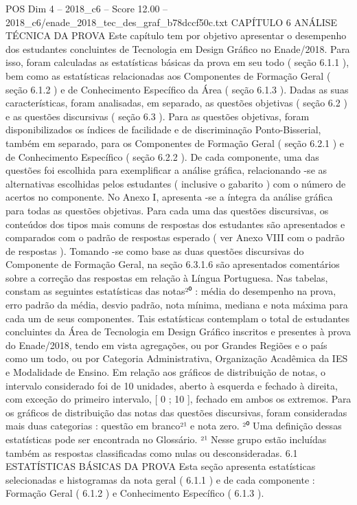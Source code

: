 \begin{textsample}{POS Dim 4 – 2018\_c6 – Score 12.00 – 2018\_c6/enade\_2018\_tec\_des\_graf\_b78dccf50c.txt}  \label{ex:f4_pos_017}
CAPÍTULO 6 ANÁLISE TÉCNICA DA PROVA Este capítulo tem por objetivo apresentar o desempenho dos estudantes concluintes de Tecnologia em Design Gráfico no Enade/2018.
Para isso, foram calculadas as estatísticas básicas da prova em seu todo ( seção 6.1.1 ), bem como as estatísticas relacionadas aos Componentes de Formação Geral ( seção 6.1.2 ) e de Conhecimento Específico da Área ( seção 6.1.3 ).
Dadas as suas características, foram analisadas, em separado, as questões objetivas ( seção 6.2 ) e as questões discursivas ( seção 6.3 ).
Para as questões objetivas, foram disponibilizados os índices de facilidade e de discriminação Ponto-Bisserial, também em separado, para os Componentes de Formação Geral ( seção 6.2.1 ) e de Conhecimento Específico ( seção 6.2.2 ).
De cada componente, uma das questões foi escolhida para exemplificar a análise gráfica, relacionando -se as alternativas escolhidas pelos estudantes ( inclusive o gabarito ) com o número de acertos no componente.
No Anexo I, apresenta -se a íntegra da análise gráfica para todas as questões objetivas.
Para cada uma das questões discursivas, os conteúdos dos tipos mais comuns de respostas dos estudantes são apresentados e comparados com o padrão de respostas esperado ( ver Anexo VIII com o padrão de respostas ).
Tomando -se como base as duas questões discursivas do Componente de Formação Geral, na seção 6.3.1.6 são apresentados comentários sobre a correção das respostas em relação à Língua Portuguesa.
Nas tabelas, constam as seguintes estatísticas das notas²⁰ : média do desempenho na prova, erro padrão da média, desvio padrão, nota mínima, mediana e nota máxima para cada um de seus componentes.
Tais estatísticas contemplam o total de estudantes concluintes da Área de Tecnologia em Design Gráfico inscritos e presentes à prova do Enade/2018, tendo em vista agregações, ou por Grandes Regiões e o país como um todo, ou por Categoria Administrativa, Organização Acadêmica da IES e Modalidade de Ensino.
Em relação aos gráficos de distribuição de notas, o intervalo considerado foi de 10 unidades, aberto à esquerda e fechado à direita, com exceção do primeiro intervalo, [ 0 ; 10 ], fechado em ambos os extremos.
Para os gráficos de distribuição das notas das questões discursivas, foram consideradas mais duas categorias : questão em branco²¹ e nota zero. ²⁰ Uma definição dessas estatísticas pode ser encontrada no Glossário. ²¹ Nesse grupo estão incluídas também as respostas classificadas como nulas ou desconsideradas. 6.1 ESTATÍSTICAS BÁSICAS DA PROVA Esta seção apresenta estatísticas selecionadas e histogramas da nota geral ( 6.1.1 ) e de cada componente : Formação Geral ( 6.1.2 ) e Conhecimento Específico ( 6.1.3 ).

\end{textsample}
